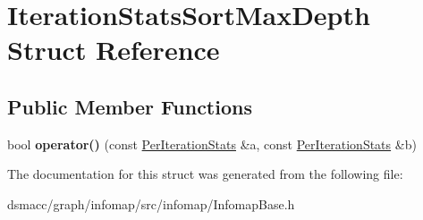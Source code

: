 \hypertarget{structIterationStatsSortMaxDepth}{}\section{Iteration\+Stats\+Sort\+Max\+Depth Struct Reference}
\label{structIterationStatsSortMaxDepth}
\subsection*{Public Member Functions}
\begin{DoxyCompactItemize}
\item 
\mbox{\label{structIterationStatsSortMaxDepth_a2b5556fb612a8be364fe966a3f114ba6}} 
bool {\bfseries operator()} (const \mbox{\hyperlink{structPerIterationStats}{Per\+Iteration\+Stats}} \&a, const \mbox{\hyperlink{structPerIterationStats}{Per\+Iteration\+Stats}} \&b)
\end{DoxyCompactItemize}


The documentation for this struct was generated from the following file\+:\begin{DoxyCompactItemize}
\item 
dsmacc/graph/infomap/src/infomap/Infomap\+Base.\+h\end{DoxyCompactItemize}
